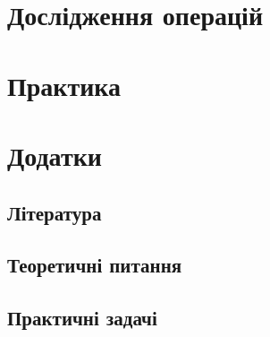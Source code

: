 \documentclass[a4paper,12pt,oneside,ukrainian]{book}
\begin{document}
\tableofcontents
\chapter{Дослідження операцій}









\chapter{Практика}



\chapter{Додатки}
\section{Література}
\section{Теоретичні питання}
\section{Практичні задачі}

\end{document}
